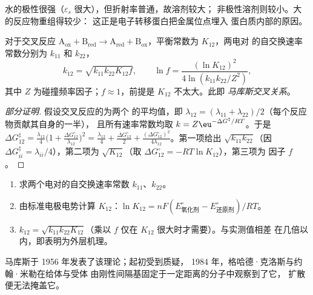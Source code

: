\admitted

水的极性很强（$\varepsilon_s$ 很大），但折射率普通，故溶剂较大；
非极性溶剂则较小。大的反应物重组得较少：
这正是电子转移蛋白把金属位点埋入
蛋白质内部的原因。

\begin{theorem}[马库斯交叉关系]\label{thm:b3:complex-mechanisms:cross-relation}
对于交叉反应 $\mathrm{A_{ox} + B_{red} \to A_{red} + B_{ox}}$，平衡常数为 $K_{12}$，两电对
的自交换速率常数分别为 $k_{11}$ 和 $k_{22}$，
\[
  k_{12} = \sqrt{k_{11}k_{22}K_{12}f}, \qquad \ln f = \frac{(\ln K_{12})^2}{4\ln(k_{11}k_{22}/Z^2)},
\]
其中 $Z$ 为碰撞频率因子；$f \approx 1$，前提是 $K_{12}$ 不太大。此即
\emph{马库斯交叉关系}。
\end{theorem}

\begin{proof}[部分证明]
假设交叉反应的为两个
的平均值，即 $\lambda_{12} = (\lambda_{11} + \lambda_{22})/2$（每个反应物贡献其自身的一半），
且所有速率常数均取 $k = Z\eu^{-\Delta G^{\ddagger}/RT}$。于是
$\Delta G_{12}^{\ddagger} = \frac{\lambda_{12}}{4}\bigl(1 + \frac{\Delta G^\circ_{12}}{\lambda_{12}}\bigr)^2 = \frac{\lambda_{12}}{4} + \frac{\Delta G^\circ_{12}}{2} + \frac{(\Delta G^\circ_{12})^2}{4\lambda_{12}}$。第一项给出
$\sqrt{k_{11}k_{22}}$（因 $\Delta G^{\ddagger}_{ii} = \lambda_{ii}/4$），第二项为 $\sqrt{K_{12}}$（取 $\Delta G^\circ_{12} = -RT\ln K_{12}$），第三项为
因子 $f$。
\end{proof}

\begin{method}[由自交换数据求交叉反应速率]\label{met:b3:complex-mechanisms:marcus-estimate}
\begin{enumerate}
  \item 求两个电对的自交换速率常数 $k_{11}$、$k_{22}$。
  \item 由标准电极电势计算 $K_{12}$：$\ln K_{12} = nF(E^\circ_{\text{氧化剂}} - E^\circ_{\text{还原剂}})/RT$。
  \item $k_{12} = \sqrt{k_{11}k_{22}K_{12}}$（乘以 $f$ 仅在 $K_{12}$ 很大时才需要）。与实测值相差
        在几倍以内，即表明为外层机理。
\end{enumerate}
\end{method}

马库斯于 1956 年发表了该理论；起初受到质疑，
1984 年，格哈德·克洛斯与约翰·米勒在给体与受体
由刚性间隔基固定于一定距离的分子中观察到了它，
扩散便无法掩盖它。

